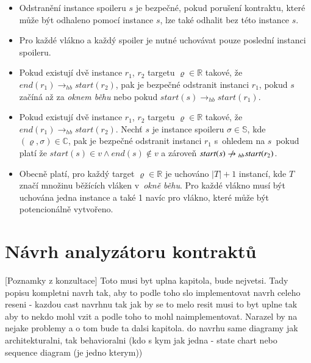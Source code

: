 \begin{itemize}
\item Odstranění instance spoileru $s$ je bezpečné, pokud porušení kontraktu, které může být odhaleno pomocí instance $s$, lze také odhalit bez této instance $s$.
\item Pro každé vlákno a každý spoiler je nutné uchovávat pouze poslední instanci spoileru. %
\item Pokud existují dvě instance $r_1$, $r_2$ targetu $\varrho \in \mathbb{R}$ takové, že $end(r_1) \rightarrow_{hb} start(r_2)$, pak je bezpečné odstranit instanci $r_1$, pokud $s$ začíná až za \textit{oknem běhu} nebo pokud $start(s) \rightarrow_{hb} start(r_1)$.%
\item Pokud existují dvě instance $r_1$, $r_2$ targetu $\varrho \in \mathbb{R}$ takové, že $end(r_1) \rightarrow_{hb} start(r_2)$. Nechť $s$ je instance spoileru $\sigma \in \mathbb{S}$, kde $(\varrho, \sigma) \in \mathbb{C}$, pak je bezpečné odstranit instanci $r_1$ s~ohledem na $s$~pokud platí že $start(s) \in v \wedge end(s) \notin v$ a zároveň $start(s) \centernot\rightarrow_{hb} start(r_2)$. %
\item Obecně platí, pro každý target $\varrho \in \mathbb{R}$ je uchováno $|T| + 1$ instancí, kde $T$ značí množinu běžících vláken v~\textit{okně běhu}. Pro každé vlákno musí být uchována jedna instance a také 1 navíc pro vlákno, které může být potencionálně vytvořeno.
\end{itemize}




\chapter{Návrh analyzátoru kontraktů}\label{navrh}

[Poznamky z konzultace] Toto musi byt uplna kapitola, bude nejvetsi. Tady popisu kompletni navrh tak, aby to podle toho slo implementovat
navrh celeho reseni - kazdou cast navrhnu tak jak by se to melo resit
musi to byt uplne tak aby to nekdo mohl vzit a podle toho to mohl naimplementovat. Narazel by na nejake problemy a o tom bude ta dalsi kapitola.
do navrhu same diagramy jak architekturalni, tak behavioralni (kdo s kym jak jedna - state chart nebo sequence diagram (je jedno kterym))

